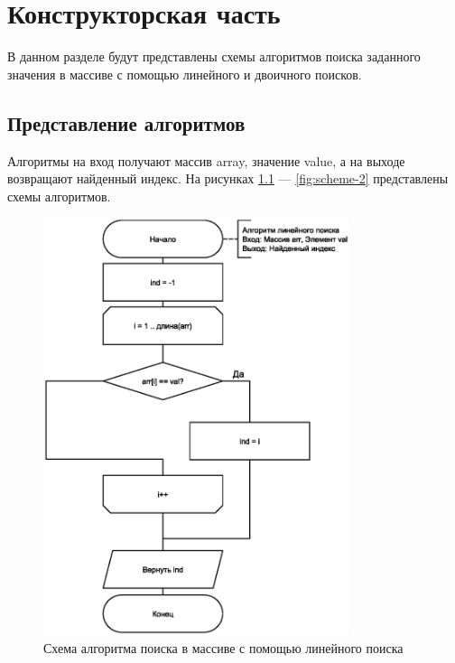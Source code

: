 \chapter{Конструкторская часть}
В данном разделе будут представлены схемы алгоритмов поиска заданного значения в массиве с помощью линейного и двоичного поисков.

\section{Представление алгоритмов}

Алгоритмы на вход получают массив array, значение value, а на выходе возвращают найденный индекс. На рисунках \ref{fig:scheme-1}
--- \ref{fig:scheme-2} представлены схемы алгоритмов.

\begin{figure}[h]
    \centering
    \includegraphics[width=0.8\textwidth]{images/schemes/linear_search.eps}
    \caption{Схема алгоритма поиска в массиве с помощью линейного поиска}
    \label{fig:scheme-1}
\end{figure}

\clearpage

